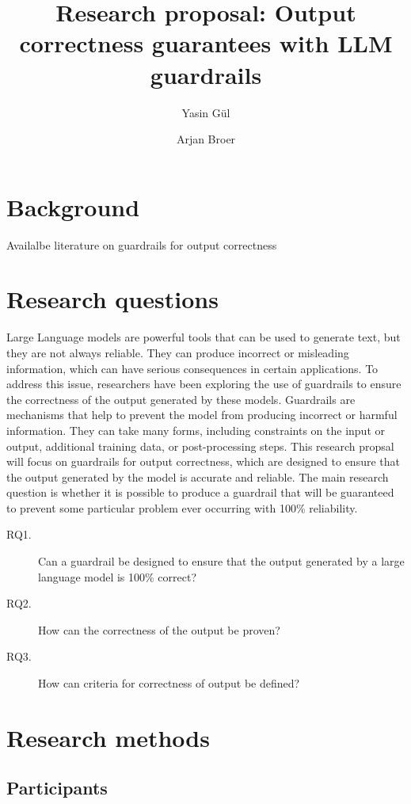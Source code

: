 \documentclass[a4paper,doc,natbib]{apa6}
\title{Research proposal: Output correctness guarantees with LLM guardrails}
\author{Yasin G\"{u}l \and Arjan Broer}
\affiliation{Open University of the Netherlands}
\begin{document}
    \maketitle

    \section{Background}

    Availalbe literature on guardrails for output correctness

    \section{Research questions}

    Large Language models are powerful tools that can be used to generate text, but they are not always reliable.
    They can produce incorrect or misleading information, which can have serious consequences in certain applications.
    To address this issue, researchers have been exploring the use of guardrails to ensure the correctness of the output generated by these models.
    Guardrails are mechanisms that help to prevent the model from producing incorrect or harmful information.
    They can take many forms, including constraints on the input or output, additional training data, or post-processing steps.
    This research propsal will focus on guardrails for output correctness, which are designed to ensure that the output generated by the model is accurate and reliable.
    The main research question is whether it is possible to produce a guardrail that will be guaranteed to prevent some particular problem ever occurring with 100\% reliability.

    \begin{description}
        \item[RQ1.] Can a guardrail be designed to ensure that the output generated by a large language model is 100\% correct?
        \item[RQ2.] How can the correctness of the output be proven?
        \item[RQ3.] How can criteria for correctness of output be defined?
    \end{description}


    \section{Research methods}

    \subsection{Participants}
\end{document}
